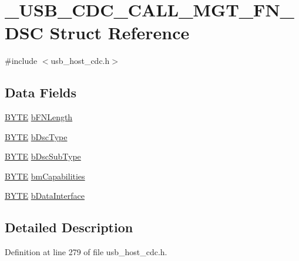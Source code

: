 \hypertarget{struct___u_s_b___c_d_c___c_a_l_l___m_g_t___f_n___d_s_c}{}\section{\+\_\+\+U\+S\+B\+\_\+\+C\+D\+C\+\_\+\+C\+A\+L\+L\+\_\+\+M\+G\+T\+\_\+\+F\+N\+\_\+\+D\+S\+C Struct Reference}
\label{struct___u_s_b___c_d_c___c_a_l_l___m_g_t___f_n___d_s_c}


{\ttfamily \#include $<$usb\+\_\+host\+\_\+cdc.\+h$>$}

\subsection*{Data Fields}
\begin{DoxyCompactItemize}
\item 
\hyperlink{_generic_type_defs_8h_a4ae1dab0fb4b072a66584546209e7d58}{B\+Y\+T\+E} \hyperlink{struct___u_s_b___c_d_c___c_a_l_l___m_g_t___f_n___d_s_c_a5cba7e463fbde92bb6daf4547a127a28}{b\+F\+N\+Length}
\item 
\hyperlink{_generic_type_defs_8h_a4ae1dab0fb4b072a66584546209e7d58}{B\+Y\+T\+E} \hyperlink{struct___u_s_b___c_d_c___c_a_l_l___m_g_t___f_n___d_s_c_a3641ecfd04e86c3ce95c6bed0c066a5d}{b\+Dsc\+Type}
\item 
\hyperlink{_generic_type_defs_8h_a4ae1dab0fb4b072a66584546209e7d58}{B\+Y\+T\+E} \hyperlink{struct___u_s_b___c_d_c___c_a_l_l___m_g_t___f_n___d_s_c_ac65bb2d41adfb877a46a2c45d2a1cb72}{b\+Dsc\+Sub\+Type}
\item 
\hyperlink{_generic_type_defs_8h_a4ae1dab0fb4b072a66584546209e7d58}{B\+Y\+T\+E} \hyperlink{struct___u_s_b___c_d_c___c_a_l_l___m_g_t___f_n___d_s_c_af373a8904dc7eab3ba5d57c69a7bbe01}{bm\+Capabilities}
\item 
\hyperlink{_generic_type_defs_8h_a4ae1dab0fb4b072a66584546209e7d58}{B\+Y\+T\+E} \hyperlink{struct___u_s_b___c_d_c___c_a_l_l___m_g_t___f_n___d_s_c_ac4ae867589893855038bb5ec8935aa78}{b\+Data\+Interface}
\end{DoxyCompactItemize}


\subsection{Detailed Description}


Definition at line 279 of file usb\+\_\+host\+\_\+cdc.\+h.



